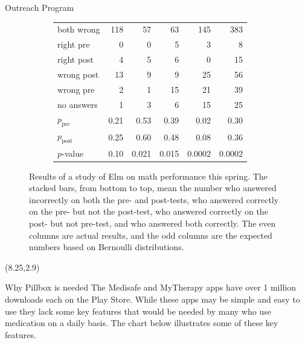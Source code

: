 \documentclass[22pt]{beamer}
\begin{document}
\begin{frame}[fragile]
\begin{textblock}{7.25}
\begin{block}{Outreach Program}
\begin{figure}
\begin{subfigure}{0.50\textwidth}
\begin{tabular}{lrrrrr}
both wrong    & 118    & 57    & 63    & 145    & 383\\
right pre    & 0    & 0    & 5    & 3    & 8\\
right post    & 4    & 5    & 6    & 0    & 15\\
wrong post    & 13    & 9    & 9    & 25    & 56\\
wrong pre    & 2    & 1    & 15    & 21    & 39\\
no answers    & 1    & 3    & 6    & 15    & 25\\
\hline
$p_\text{pre}$ & 0.21    & 0.53    & 0.39    & 0.02 & 0.30\\
$p_\text{post}$ & 0.25    & 0.60    & 0.48    & 0.08 & 0.36\\
\hline
$p$-value & 0.10 & 0.021 & 0.015 & 0.0002 & 0.0002
\end{tabular}
\end{subfigure}
\caption{Results of a study of Elm on math performance this spring. The stacked bars, from bottom to top, mean the number who answered incorrectly on both the pre- and post-tests,
who answered correctly on the pre- but not the post-test, who answered correctly on the post- but not pre-test, and who answered both correctly.
The even columns are actual results, and the odd columns are the expected numbers based on Bernoulli distributions. \label{barchart}}
\end{figure}
\vspace{-1em}
\end{block}
\end{textblock}



\begin{textblock}{7.25}(8.25,2.9)
\begin{block}{Why Pillbox is needed}
The Medisafe and MyTherapy apps have over 1 million downloads each on the Play Store. While these apps may be simple and easy to use they lack some key features that would be needed by many who use medication on a daily basis. The chart below illustrates some of these key features.


\end{block}
\end{textblock}
\end{frame}
\end{document}
